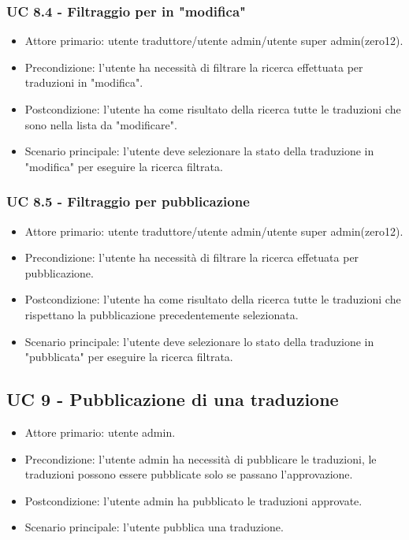     \subsubsection{UC 8.4 - Filtraggio per in "modifica"}
        \begin{itemize}
            \item Attore primario: utente traduttore/utente admin/utente super admin(zero12).
            \item Precondizione: l'utente ha necessità di filtrare la ricerca effettuata per traduzioni in "modifica".
            \item Postcondizione: l'utente ha come risultato della ricerca tutte le traduzioni che sono nella lista da "modificare". 
            \item Scenario principale: l'utente deve selezionare la stato della traduzione in "modifica" per eseguire la ricerca filtrata.
        \end{itemize}
    \subsubsection{UC 8.5 - Filtraggio per pubblicazione}
        \begin{itemize}
            \item Attore primario: utente traduttore/utente admin/utente super admin(zero12).
            \item Precondizione: l'utente ha necessità di filtrare la ricerca effetuata per pubblicazione.
            \item Postcondizione: l'utente ha come risultato della ricerca tutte le traduzioni che rispettano la pubblicazione precedentemente selezionata. 
            \item Scenario principale: l'utente deve selezionare lo stato della traduzione in "pubblicata" per eseguire la ricerca filtrata.
        \end{itemize}
\subsection{UC 9 - Pubblicazione di una traduzione}
        \begin{itemize}
            \item Attore primario: utente admin.
            \item Precondizione: l'utente admin ha necessità di pubblicare le traduzioni, le traduzioni possono essere pubblicate solo se passano l'approvazione. 
            \item Postcondizione: l'utente admin ha pubblicato le traduzioni approvate.
            \item Scenario principale: l'utente pubblica una traduzione.
        \end{itemize}
